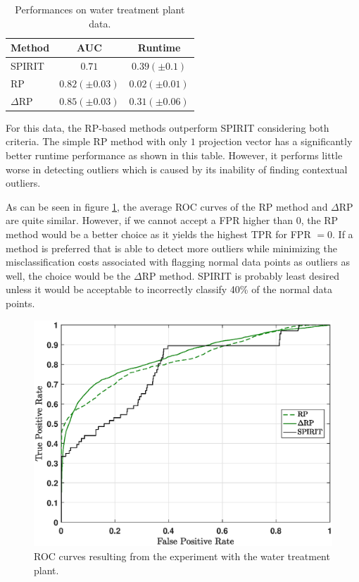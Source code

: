 \begin{table}[h]
	\centering
	\caption{Performances on water treatment plant data.}
	\label{tab:experiments_results}
	\begin{tabular}{l c c }
		\toprule	
		\textbf{Method}		& 	\textbf{AUC }					 	& \textbf{Runtime} 	\\
		\midrule
		SPIRIT		& $0.71$						&  $0.39 (\pm 0.1)$ \\
		RP			& $0.82 (\pm 0.03)$				&  $\mathbf{0.02 (\pm 0.01)}$ \\
		$\Delta$RP	& $\mathbf{0.85 (\pm 0.03)}$	&  $0.31 (\pm 0.06)$ \\
		\bottomrule
	\end{tabular}
\end{table}

For this data, the RP-based methods outperform SPIRIT considering both criteria. The simple RP method with only $1$ projection vector has a significantly better runtime performance as shown in this table. However, it performs little worse in detecting outliers which is caused by its inability of finding contextual outliers. 

As can be seen in figure \ref{fig:experiments_results}, the average ROC curves of the RP method and $\Delta$RP are quite similar. However, if we cannot accept a FPR higher than $0$, the RP method would be a better choice as it yields the highest TPR for FPR $= 0$. If a method is preferred that is able to detect more outliers while minimizing the misclassification costs associated with flagging normal data points as outliers as well, the choice would be the $\Delta$RP method. SPIRIT is probably least desired unless it would be acceptable to incorrectly classify 40\% of the normal data points.

\begin{figure}[h]
	\centering
	\includegraphics[scale=0.5]{experiments/ROCs_experiments}
	\caption{ROC curves resulting from the experiment with the water treatment plant.}
	\label{fig:experiments_results}
\end{figure}

